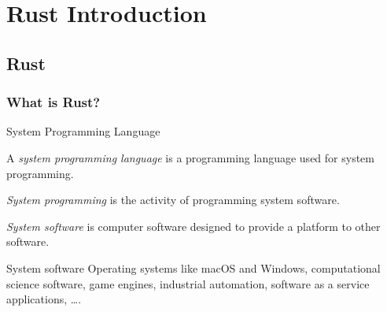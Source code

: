 
\chapter{Rust Introduction}
\label{chap_rv}

\section{Rust}

\subsection{What is Rust?}

\begin{Frame}{System Programming Language}
  \begin{Definition}
    A \emph{system programming language} is a programming language used for \alert{system programming}.
  \end{Definition}

  \pause

  \begin{Definition}
    \emph{System programming} is the activity of programming \alert{system software}.
  \end{Definition}

  \pause

  \begin{Definition}
    \emph{System software} is computer software designed to provide a platform to other software.
  \end{Definition}

  \pause

  \begin{exampleblock}{System software}
    Operating systems like macOS and Windows, computational science software, game engines, industrial automation, software as a service applications, \ldots.
  \end{exampleblock}
\end{Frame}

